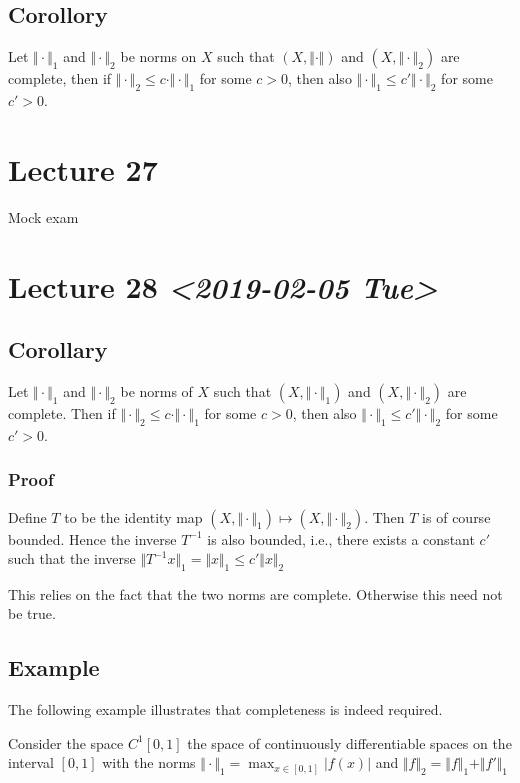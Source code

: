 \documentclass[11pt]{article}
\begin{document}
\subsection{Corollory}
\label{sec:org9272c1a}
Let \(\Vert \cdot \Vert_1\) and \(\Vert \cdot \Vert_2\) be norms on \(X\) such that
\((X, \Vert \cdot \Vert)\) and \((X, \Vert \cdot \Vert_2)\) are complete, then if
\(\Vert \cdot \Vert_2 \le c \cdot \Vert \cdot \Vert_1\) for some \(c > 0\), then
also \(\Vert \cdot \Vert_1 \le c' \Vert \cdot \Vert_2\) for some \(c' > 0\).
\section{Lecture 27}
\label{sec:orgd819b20}
Mock exam
\section{Lecture 28 \textit{<2019-02-05 Tue>}}
\label{sec:orgb1aa8c9}
\subsection{Corollary}
\label{sec:org362358d}
Let \(\Vert \cdot \Vert_1\) and \(\Vert \cdot \Vert_2\) be norms of \(X\) such that
\((X, \Vert \cdot \Vert_1)\) and \((X, \Vert \cdot \Vert_2)\) are complete. Then
if \(\Vert \cdot \Vert_2 \le c \cdot \Vert \cdot \Vert_1\) for some \(c > 0\),
then also \(\Vert \cdot \Vert_1 \le c' \Vert \cdot \Vert_2\) for some \(c' > 0\).
\subsubsection{Proof}
\label{sec:orge199c53}
Define \(T\) to be the identity map \((X, \Vert \cdot \Vert_1) \mapsto (X,
    \Vert \cdot \Vert_2)\). Then \(T\) is of course bounded. Hence the inverse
\(T^{-1}\) is also bounded, i.e., there exists a constant \(c'\) such that the
inverse \(\Vert T^{-1} x\Vert_1 = \Vert x \Vert_1 \le c' \Vert x \Vert_2\)

This relies on the fact that the two norms are complete. Otherwise this need
not be true.
\subsection{Example}
\label{sec:org6b4c5b9}
The following example illustrates that completeness is indeed required.

Consider the space \(C^{1}[0, 1]\) the space of continuously differentiable
spaces on the interval \([0, 1]\) with the norms \(\Vert \cdot \Vert_1 = \max_{x
   \in [0, 1]} \vert f(x) \vert\) and \(\Vert f\Vert_2 = \Vert f \Vert_1+ \Vert
   f'\Vert_1\)
\end{document}
